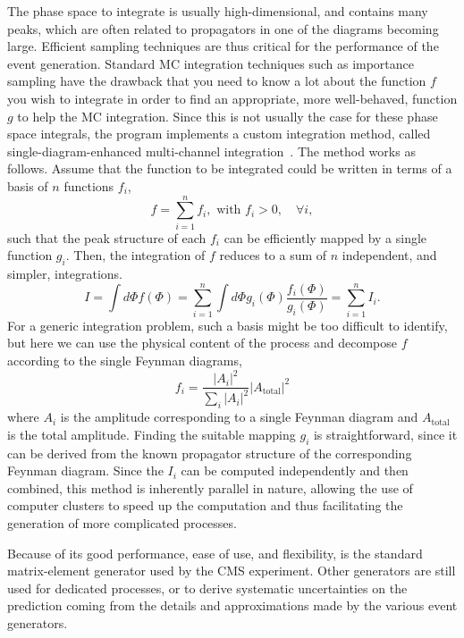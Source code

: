 The phase space to integrate is usually high-dimensional, and contains many peaks, which are often
 related to propagators in one of the diagrams becoming large. 
Efficient sampling techniques are thus critical for the performance of the event generation.
Standard MC integration techniques such as importance sampling have the drawback that you need to
know a lot about the function $f$ you wish to integrate in order to find an appropriate, more
well-behaved, function $g$ to help the MC integration. 
Since this is not usually the case for these phase space integrals, the \MADGRAPH program implements
a custom integration method, called single-diagram-enhanced multi-channel
integration~\cite{Maltoni:2002qb}.
The method works as follows.
Assume that the function to be integrated could be written in terms of a basis of $n$ functions
$f_i$,
\begin{equation}
  f = \sum_{i=1}^n f_i, \text{ with } f_i > 0, \quad \forall i,
\end{equation}
such that the peak structure of each $f_i$ can be efficiently mapped by a single function $g_i$.
Then, the integration of $f$ reduces to a sum of $n$ independent, and simpler, integrations.
\begin{equation}
  I = \int d\Phi f(\Phi) = \sum_{i=1}^n \int d\Phi g_i(\Phi) \frac{f_i(\Phi)}{g_i(\Phi)} =
\sum_{i=1}^n I_i .
\end{equation}
For a generic integration problem, such a basis might be too difficult to identify, but here we can
use the physical content of the process and decompose $f$ according to the single Feynman diagrams, 
\begin{equation}
  f_i = \frac{|A_i|^2}{\sum_i |A_i|^2} |A_{\text{total}}|^2
\end{equation}
where $A_i$ is the amplitude corresponding to a single Feynman diagram and $A_{\text{total}}$ is the
total amplitude. Finding the suitable mapping $g_i$ is straightforward, since it can be
derived from the known propagator structure of the corresponding Feynman diagram. 
Since the $I_i$ can be computed independently and then combined, this method is inherently parallel
in nature, allowing the use of computer clusters to speed up the computation and thus facilitating
the generation of more complicated processes.  

Because of its good performance, ease of use, and flexibility, \MADGRAPH is the standard
matrix-element generator used by the CMS experiment. 
Other generators are still used for dedicated processes, or to derive systematic
uncertainties on the prediction coming from the details and approximations made by the various 
event generators. 

